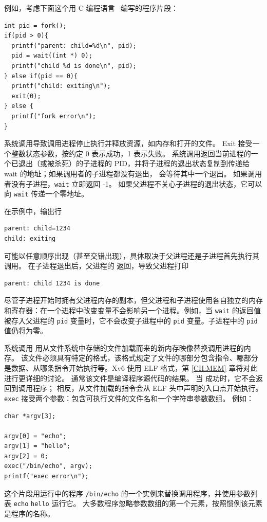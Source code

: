 例如，考虑下面这个用 C 编程语言~\cite{kernighan} 编写的程序片段：
\begin{lstlisting}[]
int pid = fork();
if(pid > 0){
  printf("parent: child=%d\n", pid);
  pid = wait((int *) 0);
  printf("child %d is done\n", pid);
} else if(pid == 0){
  printf("child: exiting\n");
  exit(0);
} else {
  printf("fork error\n");
}
\end{lstlisting}
系统调用导致调用进程停止执行并释放资源，如内存和打开的文件。
Exit 接受一个整数状态参数，按约定 0 表示成功，1 表示失败。
系统调用返回当前进程的一个已退出（或被杀死）的子进程的 PID，并将子进程的退出状态复制到传递给 wait 的地址；如果调用者的子进程都没有退出，
会等待其中一个退出。
如果调用者没有子进程，\lstinline{wait} 立即返回 -1。
如果父进程不关心子进程的退出状态，它可以向
\lstinline{wait}
传递一个零地址。

在示例中，输出行
\begin{lstlisting}[]
parent: child=1234
child: exiting
\end{lstlisting}
可能以任意顺序出现（甚至交错出现），具体取决于父进程还是子进程首先执行其
调用。
在子进程退出后，父进程的
返回，导致父进程打印
\begin{lstlisting}[]
parent: child 1234 is done
\end{lstlisting}
尽管子进程开始时拥有父进程内存的副本，但父进程和子进程使用各自独立的内存和寄存器：在一个进程中改变变量不会影响另一个进程。例如，当
\lstinline{wait}
的返回值被存入父进程的
\lstinline{pid}
变量时，它不会改变子进程中的
\lstinline{pid}
变量。子进程中的
\lstinline{pid}
值仍将为零。

系统调用
用从文件系统中存储的文件加载而来的新内存映像替换调用进程的内存。
该文件必须具有特定的格式，该格式规定了文件的哪部分包含指令、哪部分是数据、从哪条指令开始执行等。Xv6
使用 ELF 格式，第 \ref{CH:MEM} 章将对此进行更详细的讨论。
通常该文件是编译程序源代码的结果。
当
成功时，它不会返回到调用程序；
相反，从文件加载的指令会从 ELF 头中声明的入口点开始执行。
\lstinline{exec}
接受两个参数：包含可执行文件的文件名和一个字符串参数数组。
例如：
\begin{lstlisting}[]
char *argv[3];

argv[0] = "echo";
argv[1] = "hello";
argv[2] = 0;
exec("/bin/echo", argv);
printf("exec error\n");
\end{lstlisting}
这个片段用运行中的程序
\lstinline{/bin/echo}
的一个实例来替换调用程序，并使用参数列表
\lstinline{echo}
\lstinline{hello} 运行它。
大多数程序忽略参数数组的第一个元素，按照惯例该元素是程序的名称。

